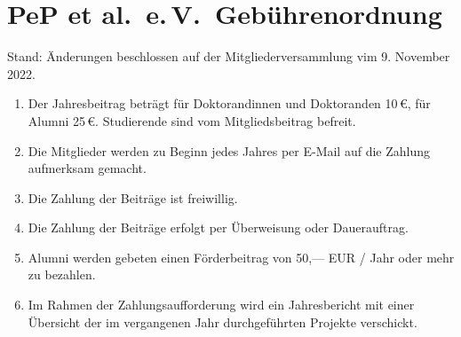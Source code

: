 \documentclass[
	fontsize=12pt,
	paper=a4,
	DIV=14,
	parskip,
]{scrartcl}
\begin{document}
\section*{PeP et al.\ e.\,V.\ Gebührenordnung}

Stand: Änderungen beschlossen auf der Mitgliederversammlung vim 9. November 2022.

\begin{enumerate}[label=(\arabic*)]
	\item Der Jahresbeitrag beträgt für Doktorandinnen und Doktoranden 10\,€, für Alumni 25\,€.
    Studierende sind vom Mitgliedsbeitrag befreit.
	\item Die Mitglieder werden zu Beginn jedes Jahres per E-Mail auf die Zahlung aufmerksam gemacht.
	\item Die Zahlung der Beiträge ist freiwillig.
	\item Die Zahlung der Beiträge erfolgt per Überweisung oder Dauerauftrag.
	\item Alumni werden gebeten einen Förderbeitrag von 50,— EUR / Jahr oder mehr zu bezahlen.
	\item Im Rahmen der Zahlungsaufforderung wird ein Jahresbericht mit einer
		Übersicht der im vergangenen Jahr durchgeführten Projekte verschickt.
\end{enumerate}
\end{document}

